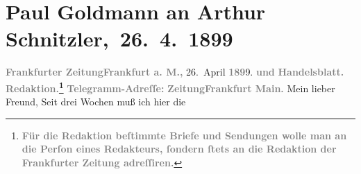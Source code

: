 

         
         \renewcommand{\erwaehntePersonen}{Personen: Julius Bauer, Alfred Dreyfus, Paul Goldmann, Karl Kraus}
         \renewcommand{\erwaehnteInstitutionen}{Institutionen: Frankfurter Zeitung}
         \renewcommand{\erwaehnteOrte}{Orte: Berlin, Deutsches Theater Berlin, Frankfurt am Main}
         \renewcommand{\erwaehnteWerke}{Werke: Der grüne Kakadu – Paracelsus – Die Gefährtin. Drei Einakter, Die Fackel, Die Vertreibung aus dem Paradiese}
               \section[ Paul Goldmann an Arthur Schnitzler, 26. 4. 1899]{ Paul Goldmann an Arthur Schnitzler, 26. 4. 1899}\nopagebreak{}\rehead{ }\begin{ledgroupsized}[t]{13cm}\normalsize\beginnumbering \toendnotes[C]{\smallbreak\pagebreak[2]} 
\toendnotes[C]{\smallbreak}\pstart
           \noindent{}{\pb}\textcolor{gray}{\textbf{\textbf{Frankfurter Zeitung}}}\hfill \textcolor{gray}{\textbf{\textbf{Frankfurt a. M.,}}}{ }26. April \textcolor{gray}{\textbf{189}}9.\pend
           \pstart
           \textcolor{gray}{\textbf{und}}\pend
           \pstart
           \textcolor{gray}{\textbf{Handelsblatt.}}\pend
           \pstart
           \textcolor{gray}{\textbf{\textbf{Redaktion.}\footnote{\noindent{}\textcolor{gray}{\textbf{Für die Redaktion beſtimmte Briefe und Sendungen wolle man
                                  an die Perſon eines Redakteurs,
                              ſondern ſtets \textbf{an die Redaktion der Frankfurter Zeitung} adreſſiren.}}}}}\pend
           \pstart
           \textcolor{gray}{\textbf{Telegramm-Adreſſe:}}\pend
           \pstart
           \textcolor{gray}{\textbf{\textbf{ZeitungFrankfurt Main.}}}\pend
           \pstart{}Mein lieber Freund,\pend\pstart
           Seit drei Wochen muß ich hier die \label{K_L02872-1v}
\end{ledgroupsized}

